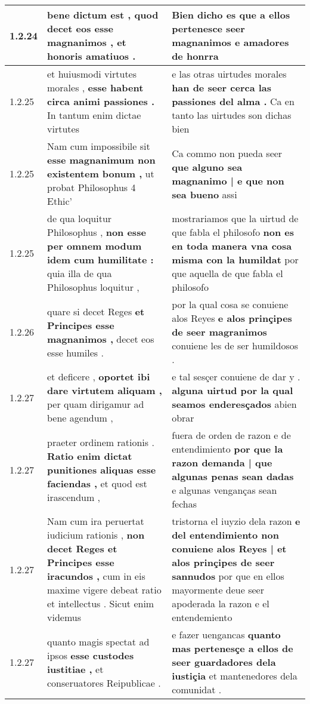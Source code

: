 \begin{tabular}{|p{1cm}|p{6.5cm}|p{6.5cm}|}
1.2.24 & bene dictum est , \textbf{ quod decet eos esse magnanimos , } et honoris amatiuos . & Bien dicho es \textbf{ que a ellos pertenesce seer magnanimos } e amadores de honrra \\\hline
1.2.25 & et huiusmodi virtutes morales , \textbf{ esse habent circa animi passiones . } In tantum enim dictae virtutes & e las otras uirtudes morales \textbf{ han de seer cerca las passiones del alma . } Ca en tanto las uirtudes son dichas bien \\\hline
1.2.25 & Nam cum impossibile sit \textbf{ esse magnanimum non existentem bonum , } ut probat Philosophus 4 Ethic’ & Ca commo non pueda seer \textbf{ que alguno sea magnanimo | e que non sea bueno } assi \\\hline
1.2.25 & de qua loquitur Philosophus , \textbf{ non esse per omnem modum idem cum humilitate : } quia illa de qua Philosophus loquitur , & mostrariamos que la uirtud de que fabla el philosofo \textbf{ non es en toda manera vna cosa misma con la humildat } por que aquella de que fabla el philosofo \\\hline
1.2.26 & quare si decet Reges \textbf{ et Principes esse magnanimos , } decet eos esse humiles . & por la qual cosa se conuiene alos Reyes \textbf{ e alos prinçipes de seer magranimos } conuiene les de ser humildosos . \\\hline
1.2.27 & et deficere , \textbf{ oportet ibi dare virtutem aliquam , } per quam dirigamur ad bene agendum , & e tal sesçer conuiene de dar y . \textbf{ alguna uirtud por la qual seamos enderesçados } abien obrar \\\hline
1.2.27 & praeter ordinem rationis . \textbf{ Ratio enim dictat punitiones aliquas esse faciendas , } et quod est irascendum , & fuera de orden de razon e de entendimiento \textbf{ por que la razon demanda | que algunas penas sean dadas } e algunas venganças sean fechas \\\hline
1.2.27 & Nam cum ira peruertat iudicium rationis , \textbf{ non decet Reges et Principes esse iracundos , } cum in eis maxime vigere debeat ratio et intellectus . Sicut enim videmus & tristorna el iuyzio dela razon \textbf{ e del entendimiento non conuiene alos Reyes | et alos prinçipes de seer sannudos } por que en ellos mayormente deue seer apoderada la razon e el entendemiento \\\hline
1.2.27 & quanto magis spectat ad ipsos \textbf{ esse custodes iustitiae , } et conseruatores Reipublicae . & e fazer uengancas \textbf{ quanto mas pertenesçe a ellos de seer guardadores dela iustiçia } et mantenedores dela comunidat . \\\hline

\end{tabular}
